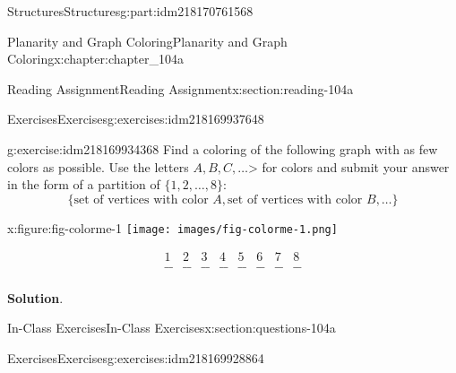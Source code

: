 \documentclass[oneside,10pt,]{book}
\newcommand{\blocktitlefont}{\relax}
\numberwithin{equation}{section}
\begin{document}
\begin{partptx}{Structures}{}{Structures}{}{}{g:part:idm218170761568}
\begin{chapterptx}{Planarity and Graph Coloring}{}{Planarity and Graph Coloring}{}{}{x:chapter:chapter_104a}
\begin{sectionptx}{Reading Assignment}{}{Reading Assignment}{}{}{x:section:reading-104a}
\begin{exercises-subsection-numberless}{Exercises}{}{Exercises}{}{}{g:exercises:idm218169937648}
\begin{exercisegroup}
\begin{divisionexerciseeg}{2}{}{}{g:exercise:idm218169934368}%
Find a coloring of the following graph with as few colors as possible.  Use the letters \(A,B,C,  \dots\)\textgreater{} for colors and submit your answer in the form of a partition of \(\{1,2,\dots, 8\}\):%
\begin{equation*}
\{\textrm{set of vertices with color }A, \textrm{set of vertices with color }B, \dots\}
\end{equation*}
%
\begin{sidebyside}{2}{0}{0}{0}%
\begin{sbspanel}{0.5}%
\begin{figureptx}{}{x:figure:fig-colorme-1}{}%
\texttt{[image: images/fig-colorme-1.png]}
\tcblower
\end{figureptx}%
\end{sbspanel}%
\begin{sbspanel}{0.5}%
%
\begin{equation*}
\begin{array}{cccccccc}
1 & 2 & 3 & 4 & 5 & 6 & 7 & 8 \\
\_\_ & \_\_ & \_\_ & \_\_ & \_\_ &
\_\_ & \_\_ & \_\_ \\
\end{array}
\end{equation*}
%
\end{sbspanel}%
\end{sidebyside}%
\par\smallskip%
\noindent\textbf{\blocktitlefont Solution}.\hypertarget{g:solution:idm218169929952}{}\quad{}%
\end{divisionexerciseeg}%
\end{exercisegroup}
\par\medskip\noindent
\end{exercises-subsection-numberless}
\end{sectionptx}
%
%
\typeout{************************************************}
\typeout{************************************************}
%
\begin{sectionptx}{In-Class Exercises}{}{In-Class Exercises}{}{}{x:section:questions-104a}
%
%
%
\typeout{************************************************}
\typeout{************************************************}
%
\begin{exercises-subsection-numberless}{Exercises}{}{Exercises}{}{}{g:exercises:idm218169928864}
\par\medskip\noindent%

\end{exercises-subsection-numberless}
\end{sectionptx}
\end{chapterptx}
\end{partptx}
\end{document}
